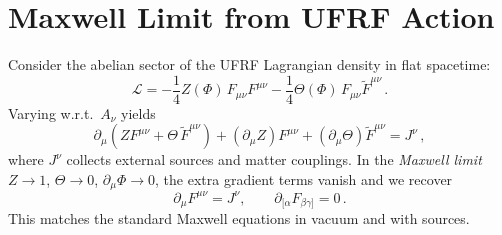 
\section*{Maxwell Limit from UFRF Action}
Consider the abelian sector of the UFRF Lagrangian density in flat spacetime:
\begin{equation}
\mathcal{L} = -\frac14 Z(\Phi)\,F_{\mu\nu}F^{\mu\nu} - \frac14 \Theta(\Phi)\, F_{\mu\nu}\tilde F^{\mu\nu}\,.
\end{equation}
Varying w.r.t.\ $A_\nu$ yields
\begin{equation}
\partial_\mu\!\left(Z F^{\mu\nu} + \Theta\, \tilde F^{\mu\nu}\right)
+ (\partial_\mu Z) F^{\mu\nu} + (\partial_\mu\Theta)\tilde F^{\mu\nu} = J^\nu\,,
\end{equation}
where $J^\nu$ collects external sources and matter couplings.
In the \emph{Maxwell limit} $Z\!\to\!1$, $\Theta\!\to\!0$, $\partial_\mu\Phi\!\to\!0$, the extra gradient terms vanish and we recover
\begin{equation}
\partial_\mu F^{\mu\nu} = J^\nu,\qquad \partial_{[\alpha}F_{\beta\gamma]}=0\,.
\end{equation}
This matches the standard Maxwell equations in vacuum and with sources.
